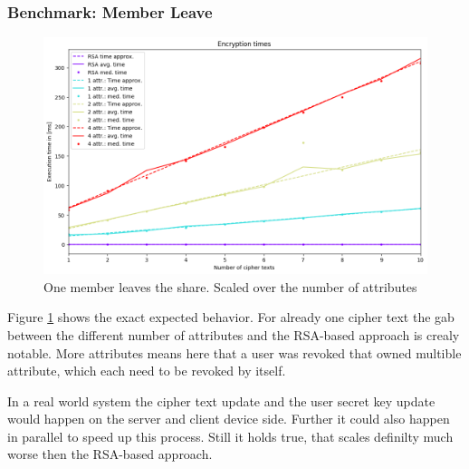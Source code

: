 \subsubsection{Benchmark: Member Leave}
\begin{figure}[!ht]
\centering
    \includegraphics[width=\linewidth]{img/eval-leave/leave_attr_1_users_2.png}
    \caption{One member leaves the share. Scaled over the number of attributes}
    \label{fig:member-leave}
\end{figure}

Figure \ref{fig:member-leave} shows the exact expected behavior. For already one cipher text the gab between the different number of attributes and the RSA-based approach is crealy notable. More attributes means here that a user was revoked that owned multible attribute, which each need to be revoked by itself. 

In a real world system the cipher text update and the user secret key update would happen on the server and client device side. Further it could also happen in parallel to speed up this process. Still it holds true, that \name scales definilty much worse then the RSA-based approach.
